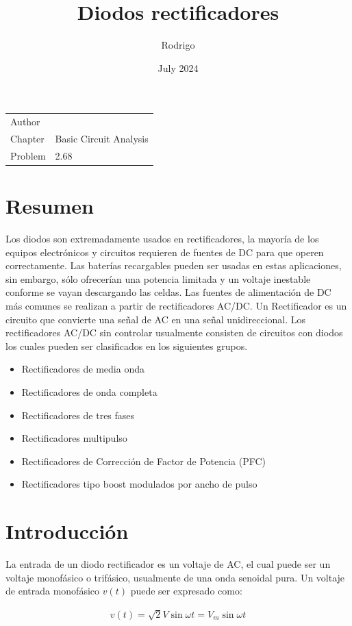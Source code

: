 \documentclass{article}
\title{Diodos rectificadores}
\author{Rodrigo}
\date{July 2024}
\begin{document}
	
	\maketitle
	
	\noindent\begin{tabular}{@{}ll}
		Author & \theauthor\\
		Chapter &  Basic Circuit Analysis\\
		Problem & 2.68
	\end{tabular}
	
	\section*{Resumen}
	Los diodos son extremadamente usados en rectificadores, la mayoría de los equipos electrónicos y circuitos requieren de fuentes de DC para que operen correctamente. Las baterías recargables pueden ser usadas en estas aplicaciones, sin embargo, sólo ofrecerían una potencia limitada y un voltaje inestable conforme se vayan descargando las celdas. Las fuentes de alimentación de DC más comunes se realizan a partir de rectificadores AC/DC.
	Un Rectificador es un circuito que convierte una señal de AC en una señal unidireccional. Los rectificadores AC/DC sin controlar usualmente consisten de circuitos con diodos los cuales pueden ser clasificados en los siguientes grupos.
	
	\begin{itemize}[noitemsep]
		\item Rectificadores de media onda
		\item Rectificadores de onda completa
		\item Rectificadores de tres fases
		\item Rectificadores multipulso
		\item Rectificadores de Corrección de Factor de Potencia (PFC)
		\item Rectificadores tipo boost modulados por ancho de pulso 
	\end{itemize}

	
	\section*{Introducción}
	La entrada de un diodo rectificador es un voltaje de AC, el cual puede ser un voltaje monofásico o trifásico, usualmente de una onda senoidal pura. Un voltaje de entrada monofásico $v(t)$ puede ser expresado como:
	
	\begin{align}
		v(t) = \sqrt{2}V \sin{\omega t} = V_m \sin{\omega t}
	\end{align}
	
\end{document}
